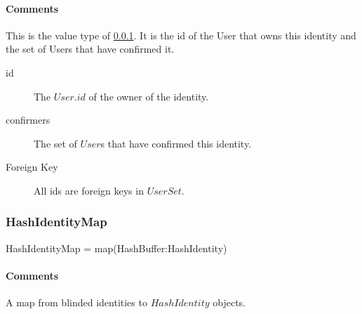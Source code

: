 \documentclass[a4paper,10pt]{article}
\begin{document}
\begin{inparaitem}[ ]
 \item \infrastructure
\end{inparaitem}

\paragraph*{Comments}
This is the value type of \ref{sec:structure:server:hash_identity_map}. It is the id of the User that owns this identity and the set of Users that have confirmed it.

\SpecialItem
\begin{description}
 \item[id] The $User.id$ of the owner of the identity.
 \item[confirmers] The set of $User$s that have confirmed this identity.
\end{description}

\SpecialItem
\begin{description}
 \item[Foreign Key] All ids are foreign keys in $UserSet$.
\end{description}

\subsubsection{HashIdentityMap}
\label{sec:structure:server:hash_identity_map}
\begin{verbbox}
HashIdentityMap = map(HashBuffer:HashIdentity)
\end{verbbox}
\begin{center}
\theverbbox
\end{center}

\begin{inparaitem}[ ]
 \item \secure
 \item \persistent
 \item \unique
\end{inparaitem}

\paragraph*{Comments}
A map from blinded identities to $HashIdentity$ objects.



\end{document}
